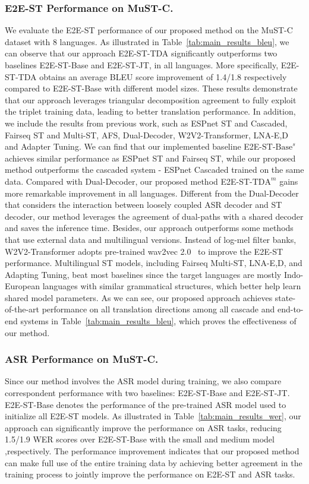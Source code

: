 \documentclass[letterpaper]{article} %
\begin{document}
\subsubsection*{E2E-ST Performance on MuST-C.}
We evaluate the E2E-ST performance of our proposed method on the MuST-C dataset with 8 languages.
As illustrated in Table~\ref{tab:main_results_bleu}, we can observe that our approach E2E-ST-TDA significantly outperforms two baselines E2E-ST-Base and E2E-ST-JT, in all languages.
More specifically, E2E-ST-TDA obtains an average BLEU score improvement of 1.4/1.8 respectively compared to E2E-ST-Base with different model sizes.
These results demonstrate that our approach leverages triangular decomposition agreement to fully exploit the triplet training data, leading to better translation performance.
In addition, we include the results from previous work, such as ESPnet ST and Cascaded, Fairseq ST and Multi-ST, AFS, Dual-Decoder, W2V2-Transformer, LNA-E,D and Adapter Tuning.
We can find that our implemented baseline E2E-ST-$\text{Base}^{s}$ achieves similar performance as ESPnet ST and Fairseq ST, while our proposed method outperforms the cascaded system - ESPnet Cascaded trained on the same data.
Compared with Dual-Decoder, our proposed method E2E-ST-$\text{TDA}^{m}$ gains more remarkable improvement in all languages.
Different from the Dual-Decoder that considers the interaction between loosely coupled ASR decoder and ST decoder, our method leverages the agreement of dual-paths with a shared decoder and saves the inference time.
Besides, our approach outperforms some methods that use external data and multilingual versions.
Instead of log-mel filter banks, W2V2-Transformer adopts pre-trained wav2vec 2.0~\cite{Baevski2020wav2vec2A} to improve the E2E-ST performance.
Multilingual ST models, including Fairseq Multi-ST, LNA-E,D, and Adapting Tuning, beat most baselines since the target languages are mostly Indo-European languages with similar grammatical structures, which better help learn shared model parameters.
As we can see, our proposed approach achieves state-of-the-art performance on all translation directions among all cascade and end-to-end systems in Table~\ref{tab:main_results_bleu}, which proves the effectiveness of our method.


\subsubsection*{ASR Performance on MuST-C.}
Since our method involves the ASR model during training, we also compare correspondent performance with two baselines: E2E-ST-Base and E2E-ST-JT.
E2E-ST-Base denotes the performance of the pre-trained ASR model used to initialize all E2E-ST models.
As illustrated in Table~\ref{tab:main_results_wer}, our approach can significantly improve the performance on ASR tasks, reducing 1.5/1.9 WER scores over E2E-ST-Base with the small and medium model ,respectively.
The performance improvement indicates that our proposed method can make full use of the entire training data by achieving better agreement in the training process to jointly improve the performance on E2E-ST and ASR tasks.
\end{document}
